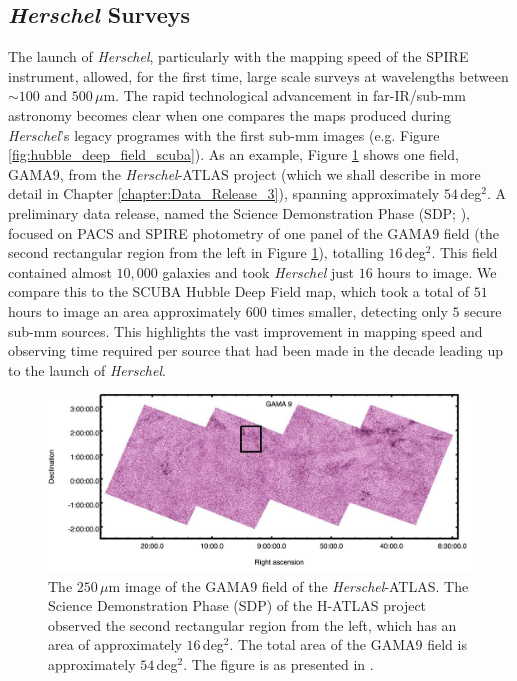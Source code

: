 \subsection{\textit{Herschel} Surveys}

The launch of \textit{Herschel}, particularly with the mapping speed of the SPIRE instrument, allowed, for the first time, large scale surveys at wavelengths between $\sim 100$ and $500\,\mu$m. The rapid technological advancement in far-IR/sub-mm astronomy becomes clear when one compares the maps produced during \textit{Herschel}'s legacy programes with the first sub-mm images (e.g. Figure \ref{fig:hubble_deep_field_scuba}). As an example, Figure \ref{fig:gama9} shows one field, GAMA9, from the \textit{Herschel}-ATLAS project (which we shall describe in more detail in Chapter \ref{chapter:Data_Release_3}), spanning approximately $54\,$deg$^2$. A preliminary data release, named the Science Demonstration Phase (SDP; \citealt{Ibar_2010, Rigby_2011, Pascale_2011}), focused on PACS and SPIRE photometry of one panel of the GAMA9 field (the second rectangular region from the left in Figure \ref{fig:gama9}), totalling $16\,$deg$^2$. This field contained almost $10,000$ galaxies and took \textit{Herschel} just $16$ hours to image. We compare this to the SCUBA Hubble Deep Field map, which took a total of $51$ hours to image an area approximately $600$ times smaller, detecting only $5$ secure sub-mm sources. This highlights the vast improvement in mapping speed and observing time required per source that had been made in the decade leading up to the launch of \textit{Herschel}.

\begin{figure}
    \centering
	\includegraphics[width=0.9\columnwidth]{Figures/GAMA9.pdf}
	\caption[$250\,\mu$m map of the GAMA9 field of H-ATLAS]{The $250\,\mu$m image of the GAMA9 field of the \textit{Herschel}-ATLAS. The Science Demonstration Phase (SDP) of the H-ATLAS project observed the second rectangular region from the left, which has an area of approximately $16\,$deg$^2$. The total area of the GAMA9 field is approximately $54\,$deg$^2$. The figure is as presented in \citealt{Valiante_2016}.}
	\label{fig:gama9}
\end{figure}

